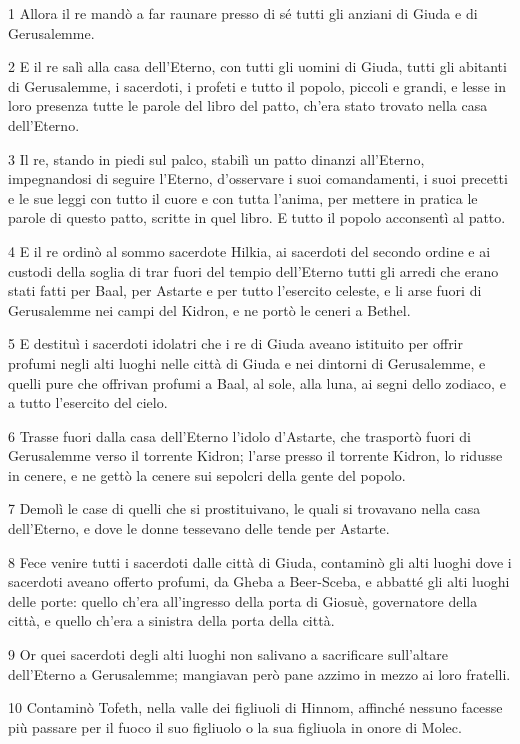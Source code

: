 \par 1 Allora il re mandò a far raunare presso di sé tutti gli anziani di Giuda e di Gerusalemme.
\par 2 E il re salì alla casa dell'Eterno, con tutti gli uomini di Giuda, tutti gli abitanti di Gerusalemme, i sacerdoti, i profeti e tutto il popolo, piccoli e grandi, e lesse in loro presenza tutte le parole del libro del patto, ch'era stato trovato nella casa dell'Eterno.
\par 3 Il re, stando in piedi sul palco, stabilì un patto dinanzi all'Eterno, impegnandosi di seguire l'Eterno, d'osservare i suoi comandamenti, i suoi precetti e le sue leggi con tutto il cuore e con tutta l'anima, per mettere in pratica le parole di questo patto, scritte in quel libro. E tutto il popolo acconsentì al patto.
\par 4 E il re ordinò al sommo sacerdote Hilkia, ai sacerdoti del secondo ordine e ai custodi della soglia di trar fuori del tempio dell'Eterno tutti gli arredi che erano stati fatti per Baal, per Astarte e per tutto l'esercito celeste, e li arse fuori di Gerusalemme nei campi del Kidron, e ne portò le ceneri a Bethel.
\par 5 E destituì i sacerdoti idolatri che i re di Giuda aveano istituito per offrir profumi negli alti luoghi nelle città di Giuda e nei dintorni di Gerusalemme, e quelli pure che offrivan profumi a Baal, al sole, alla luna, ai segni dello zodiaco, e a tutto l'esercito del cielo.
\par 6 Trasse fuori dalla casa dell'Eterno l'idolo d'Astarte, che trasportò fuori di Gerusalemme verso il torrente Kidron; l'arse presso il torrente Kidron, lo ridusse in cenere, e ne gettò la cenere sui sepolcri della gente del popolo.
\par 7 Demolì le case di quelli che si prostituivano, le quali si trovavano nella casa dell'Eterno, e dove le donne tessevano delle tende per Astarte.
\par 8 Fece venire tutti i sacerdoti dalle città di Giuda, contaminò gli alti luoghi dove i sacerdoti aveano offerto profumi, da Gheba a Beer-Sceba, e abbatté gli alti luoghi delle porte: quello ch'era all'ingresso della porta di Giosuè, governatore della città, e quello ch'era a sinistra della porta della città.
\par 9 Or quei sacerdoti degli alti luoghi non salivano a sacrificare sull'altare dell'Eterno a Gerusalemme; mangiavan però pane azzimo in mezzo ai loro fratelli.
\par 10 Contaminò Tofeth, nella valle dei figliuoli di Hinnom, affinché nessuno facesse più passare per il fuoco il suo figliuolo o la sua figliuola in onore di Molec.
